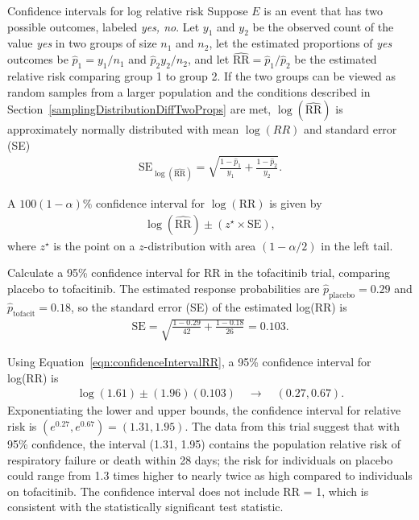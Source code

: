 \begin{onebox}{Confidence intervals for log relative risk}
  Suppose $E$ is an event that has two possible outcomes, labeled \textit{yes, no}. Let $y_1$ and $y_2$ be the observed count of the value \textit{yes} in two groups of size $n_1$ and $n_2$, let the estimated proportions of \textit{yes} outcomes be $\hat{p}_1 = y_1/n_1$ and $\hat{p}_2 y_2/n_2$, and let $\widehat{\text{RR}} = \hat{p}_1/\hat{p}_2$ be the estimated relative risk comparing group 1 to group 2.  If the two groups can be viewed as random samples from a larger population and the conditions described in Section~\ref{samplingDistributionDiffTwoProps} are met,  $\log(\widehat{\text{RR}})$ is approximately normally distributed with mean  $\log(RR)$ and standard error (SE)
  \begin{align*}
  \text{SE}_{\log(\widehat{\text{RR}})} = \sqrt{\frac{1 - \hat{p}_1}{y_1} + \frac{1 - \hat{p}_2}{y_2}}. 
  \end{align*}

  A $100(1  - \alpha)\%$ confidence interval for $\log(\text{RR})$ is given by
\begin{align}
  \log(\widehat{\text{RR}}) \pm (z^{\star} \times \text{SE}),
  \label{eqn:confidenceIntervalRR}
\end{align}  
where $z^{\star}$ is the point on a $z$-distribution with area $(1 - \alpha/2)$ in the left tail.
\end{onebox}


\begin{examplewrap}
  \begin{nexample}{Calculate a 95\% confidence interval for RR in the tofacitinib trial, comparing placebo to tofacitinib.}
   The estimated response probabilities are $\hat{p}_{\text{placebo}} = 0.29$ and $\hat{p}_{\text{tofacit}} = 0.18$, so the standard error (SE) of the estimated log(RR) is 
 \begin{align*}
    \text{SE} = \sqrt{\frac{1 - 0.29}{42} + \frac{1 - 0.18}{26}} = 0.103. 
  \end{align*}

  Using Equation~\ref{eqn:confidenceIntervalRR}, a 95\% confidence interval for log(RR) is 
    \begin{align*}
      \log(1.61) \pm (1.96)(0.103) \quad  \to \quad (0.27, 0.67).
    \end{align*}
    Exponentiating the lower and upper bounds, the confidence interval for relative risk is $(e^{0.27}, e^{0.67}) = (1.31, 1.95)$. The data from this trial suggest that with 95\% confidence, the interval (1.31, 1.95) contains the population relative risk of respiratory failure or death within 28 days; the risk for individuals on placebo could range from 1.3 times higher to nearly twice as high compared to individuals on tofacitinib. The confidence interval does not include RR = 1, which is consistent with the statistically significant test statistic.
  \end{nexample}
\end{examplewrap}

